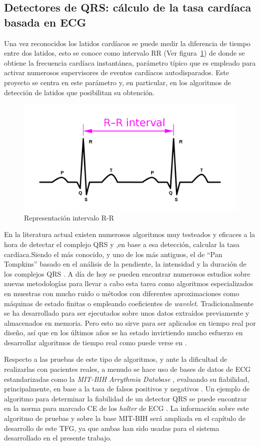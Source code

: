 \subsection{Detectores de QRS: cálculo de la tasa cardíaca basada en ECG}

Una vez reconocidos los latidos cardíacos se puede medir la diferencia de tiempo entre dos latidos, esto se conoce como intervalo RR (Ver figura~\ref{fig:RRInterval})  de donde se obtiene la frecuencia cardíaca instantánea, parámetro típico que es empleado para activar numerosos supervisores de eventos cardíacos autodisparados. Este proyecto se centra en este parámetro y, en particular, en los algoritmos de detección de latidos que posibilitan su obtención.  

\begin{figure}[ht]
	\centering
		\includegraphics[width=0.6\linewidth]{figuras/RRInterval.png}
	\caption{Representación intervalo R-R}
	\label{fig:RRInterval}
\end{figure} 

En la literatura actual existen numerosos algoritmos muy testeados y eficaces a la hora de detectar el complejo QRS y ,en base a esa detección, calcular la tasa cardíaca.Siendo el más conocido, y uno de los más antiguos, el de ``Pan Tompkins'' basado en el análisis de la pendiente, la intensidad y la duración de los complejos QRS \cite{PanTompkins}. A día de hoy se pueden encontrar numerosos estudios sobre nuevas metodologías para llevar a cabo esta tarea como algoritmos especializados en muestras con mucho ruido \cite{RsSlope} o métodos con diferentes aproximaciones como máquinas de estado finitas \cite{FSM} o empleando coeficientes de \textit{wavelet}.\cite{Wavelet} Tradicionalmente se ha desarrollado para ser ejecutados sobre unos datos extraídos previamente y almacenados en memoria. Pero esto no sirve para ser aplicados en tiempo real por diseño, así que en los últimos años se ha estado invirtiendo mucho esfuerzo en desarrollar algoritmos de tiempo real como puede verse en \cite{Arefin,Kohler}. 

Respecto a las pruebas de este tipo de algoritmos,  y ante la dificultad de realizarlas con pacientes reales,  a menudo se hace uso de bases de datos de ECG estandarizadas como la \textit{MIT-BIH Arrythmia Database} \cite{MIT-BIH}, evaluando su fiabilidad, principalmente, en base a la tasa de falsos positivos y negativos \cite{Pooja}. Un ejemplo de algoritmo para determinar la fiabilidad de un detector QRS se puede encontrar en la norma para marcado CE de los \textit{holter} de ECG \cite{Aenor2002}. La información sobre este algoritmo de pruebas y sobre la base MIT-BIH será ampliada en el capítulo de desarrollo de este TFG, ya que ambas han sido usadas para el sistema desarrollado en el presente trabajo. 

